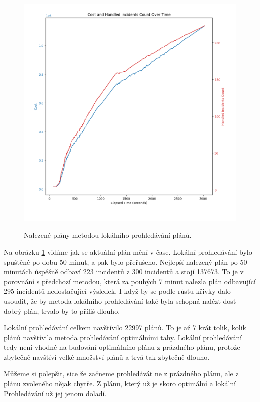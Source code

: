 \begin{figure}[H]
  \caption{Nalezené plány metodou lokálního prohledávání plánů.}
  \includegraphics[width=\textwidth]{img/local_search_empty_plan_plot.png}
  \centering
  \label{img:localSearchRes}
\end{figure}

Na obrázku \ref{img:localSearchRes} vidíme jak se aktuální plán mění v čase.
Lokální prohledávání bylo spuštěné po dobu 50 minut, a pak bylo přeřušeno. 
Nejlepší nalezený plán po 50 minutách úspěšně odbaví 223 incidentů z 300 incidentů a stojí 137673.
To je v porovnání s předchozí metodou, která za pouhých 7 minut nalezla plán odbavující 295 incidentů nedostačující výsledek.
I když by se podle růstu křivky dalo usoudit, že by metoda lokálního prohledávání také byla schopná nalézt dost dobrý plán, trvalo by to příliš dlouho.

Lokální prohledávání celkem navštívilo 22997 plánů. To je až 7 krát tolik, kolik plánů navštívila metoda prohledávání optimálními tahy.
Lokální prohledávání tedy není vhodné na budování optimálního plánu z prázdného plánu, protože zbytečně navštíví velké množství plánů a trvá tak zbytečně dlouho.

Můžeme si polepšit, sice že začneme prohledávát ne z prázdného plánu, ale z plánu zvoleného nějak chytře. Z plánu, který už je skoro optimální a lokální Prohledávání
už jej jenom doladí.

